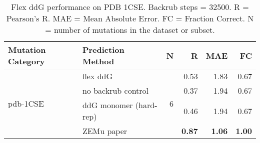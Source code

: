 \begin{table}
  \begin{tabular}{llrrrr}
\toprule
Mutation Category &       Prediction Method &  N &    R &  MAE &   FC \\
\midrule
 \multirow{ 4}{*}{pdb-1CSE} & flex ddG & \multirow{ 4}{*}{6} & 0.53 & 1.83 & 0.67  \\
 & no backrub control & & 0.37 & 1.94 & 0.67  \\
 & ddG monomer (hard-rep) & & 0.46 & 1.94 & 0.67  \\
 & ZEMu paper & & \textbf{0.87} & \textbf{1.06} & \textbf{1.00}  \\
\bottomrule
\end{tabular}
  \caption[Flex ddG performance on PDB 1CSE]{
    Flex ddG performance on PDB 1CSE. Backrub steps = 32500. R = Pearson's R. MAE = Mean Absolute Error. FC = Fraction Correct. N = number of mutations in the dataset or subset.
  } \label{tab:table-pdb-1CSE}
\end{table}
